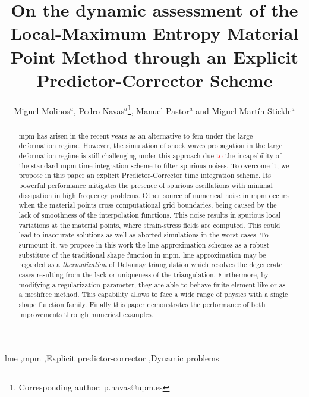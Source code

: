 \documentclass[preprint,12pt,a4paper]{elsarticle}
\begin{document}
 

\begin{frontmatter}

\title{On the dynamic assessment of the Local-Maximum Entropy Material Point Method through an Explicit Predictor-Corrector Scheme}

\author{
Miguel Molinos$^a$,
Pedro Navas$^a$\footnote{Corresponding author: p.navas@upm.es},
Manuel Pastor$^a$
and Miguel Mart\'in Stickle$^a$}
\address{
  $^a$ ETSI Caminos, Canales y Puertos, Universidad Polit\'ectnica de Madrid.\\ c. Prof. Aranguren 3, 28040 Madrid, Spain
}

\begin{abstract}
  \acrfull{mpm} has arisen in the recent years as an
  alternative to \acrfull{fem} under the large
  deformation regime. However, the simulation of shock waves
  propagation in the large deformation regime is still challenging
  under this approach due \textcolor{red}{to} the incapability of the standard \acrshort{mpm} time
  integration scheme to filter spurious noises. To overcome it, we propose in this paper an explicit Predictor-Corrector time
    integration scheme. Its powerful performance mitigates the
  presence of spurious oscillations with minimal dissipation in high
  frequency problems. Other source of numerical noise in
  \acrshort{mpm} occurs when the material points cross computational grid boundaries, being caused by
  the lack of smoothness of the interpolation functions. This noise
  results in spurious local variations at the material points, where
  strain-stress fields are computed. This could lead to inaccurate
  solutions as well as aborted simulations in the worst cases. To
  surmount it, we propose in this work the \acrfull{lme} approximation
  schemes as a robust substitute of the traditional shape function in
  \acrshort{mpm}. \acrshort{lme} approximation may be regarded as a
  \textit{thermalization} of Delaunay triangulation which resolves the
  degenerate cases resulting from the lack or uniqueness of the
  triangulation. Furthermore, by modifying a regularization parameter,
  they are able to behave finite element like or as a meshfree
  method. This capability allows to face a wide range of physics
  with a single shape function family. Finally this paper demonstrates
  the performance of both improvements through numerical examples.    
\end{abstract}

\begin{keyword}
  \acrshort{lme} \sep \acrshort{mpm} \sep Explicit predictor-corrector \sep Dynamic problems
\end{keyword}


\end{frontmatter}
\end{document}
